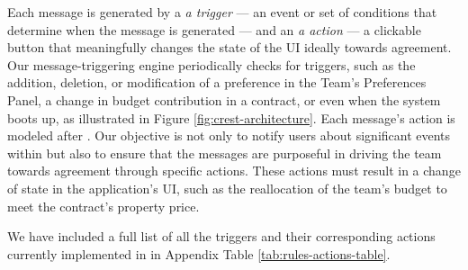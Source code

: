 Each \cbot message is generated by a \textit{a trigger} --- an event or set of conditions that determine when the \cbot message is generated --- and an \textit{a action} --- a clickable button that meaningfully changes the state of the UI ideally towards agreement. Our \cbot message-triggering engine periodically checks for triggers, such as the addition, deletion, or modification of a preference in the Team's Preferences Panel, a change in budget contribution in a contract, or even when the system boots up, as illustrated in Figure \ref{fig:crest-architecture}. Each message's action is modeled after \pGoalCenteredFlow. Our objective is not only to notify users about significant events within \tool but also to ensure that the messages are purposeful in driving the team towards agreement through specific actions. These actions must result in a change of state in the application's UI, such as the reallocation of the team's budget to meet the contract's property price.

We have included a full list of all the triggers and their corresponding actions currently implemented in \tool in Appendix Table \ref{tab:rules-actions-table}.